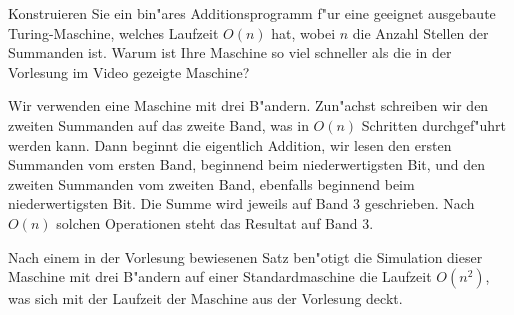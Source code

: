 Konstruieren Sie ein bin"ares Additionsprogramm f"ur eine geeignet
ausgebaute Turing-Maschine, welches Laufzeit
$O(n)$ hat, wobei $n$ die Anzahl Stellen der Summanden ist.
Warum ist Ihre Maschine so viel schneller als die in der Vorlesung
im Video gezeigte Maschine?

\begin{loesung}
Wir verwenden eine Maschine mit drei B"andern. Zun"achst schreiben
wir den zweiten Summanden auf das zweite Band, was in $O(n)$
Schritten durchgef"uhrt werden kann.
Dann beginnt die
eigentlich Addition, wir lesen den ersten Summanden vom ersten Band,
beginnend beim niederwertigsten Bit, und den zweiten Summanden
vom zweiten Band, ebenfalls beginnend beim niederwertigsten Bit.
Die Summe wird jeweils auf Band 3 geschrieben. Nach $O(n)$
solchen Operationen steht das Resultat auf Band 3.

Nach einem in der Vorlesung bewiesenen Satz ben"otigt
die Simulation dieser Maschine mit drei B"andern auf einer Standardmaschine
die Laufzeit $O(n^2)$, was sich mit der Laufzeit der Maschine
aus der Vorlesung deckt.
\end{loesung}


